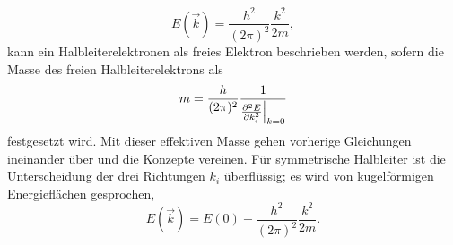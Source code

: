 \begin{equation}
    E(\vec k) = \frac{h^2}{(2\pi)^2}\frac{k^2}{2m},
\end{equation}
kann ein Halbleiterelektronen als freies Elektron beschrieben werden, sofern die Masse des freien Halbleiterelektrons als
\begin{equation}
    m = \frac{h}{(2\pi)^2}\frac{1}{\frac{\partial^2 E}{\partial k_i^2}\Bigl|_{k=0}}
\end{equation}
festgesetzt wird.
Mit dieser effektiven Masse gehen vorherige Gleichungen ineinander über und die Konzepte vereinen.
Für symmetrische Halbleiter ist die Unterscheidung der drei Richtungen $k_i$ überflüssig;
es wird von kugelförmigen Energieflächen gesprochen,
\begin{equation}
    E(\vec k) = E(0) + \frac{h^2}{(2\pi)^2}\frac{k^2}{2m}.
\end{equation}
